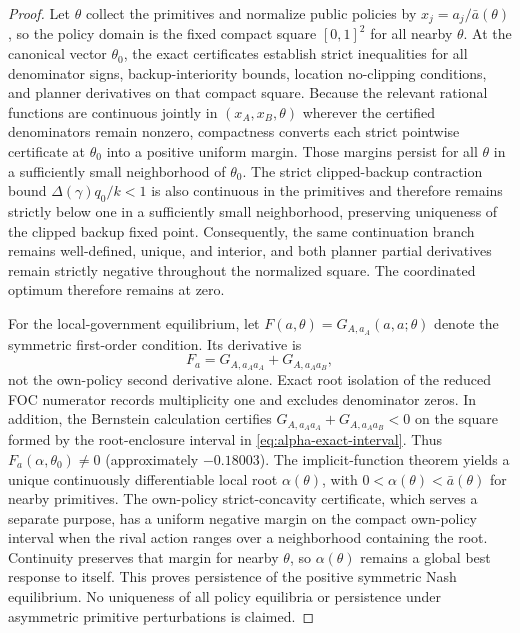 \begin{proof}
Let $\theta$ collect the primitives and normalize public policies by $x_j=a_j/\bar a(\theta)$, so the policy domain is the fixed compact square $[0,1]^2$ for all nearby $\theta$. At the canonical vector $\theta_0$, the exact certificates establish strict inequalities for all denominator signs, backup-interiority bounds, location no-clipping conditions, and planner derivatives on that compact square. Because the relevant rational functions are continuous jointly in $(x_A,x_B,\theta)$ wherever the certified denominators remain nonzero, compactness converts each strict pointwise certificate at $\theta_0$ into a positive uniform margin. Those margins persist for all $\theta$ in a sufficiently small neighborhood of $\theta_0$. The strict clipped-backup contraction bound $\Delta(\gamma)q_0/k<1$ is also continuous in the primitives and therefore remains strictly below one in a sufficiently small neighborhood, preserving uniqueness of the clipped backup fixed point. Consequently, the same continuation branch remains well-defined, unique, and interior, and both planner partial derivatives remain strictly negative throughout the normalized square. The coordinated optimum therefore remains at zero.

For the local-government equilibrium, let $F(a,\theta)=G_{A,a_A}(a,a;\theta)$ denote the symmetric first-order condition. Its derivative is
\begin{equation}
F_a=G_{A,a_Aa_A}+G_{A,a_Aa_B},
\label{eq:diagonal-foc-derivative}
\end{equation}
not the own-policy second derivative alone. Exact root isolation of the reduced FOC numerator records multiplicity one and excludes denominator zeros. In addition, the Bernstein calculation certifies $G_{A,a_Aa_A}+G_{A,a_Aa_B}<0$ on the square formed by the root-enclosure interval in \eqref{eq:alpha-exact-interval}. Thus $F_a(\alpha,\theta_0)\neq0$ (approximately $-0.18003$). The implicit-function theorem yields a unique continuously differentiable local root $\alpha(\theta)$, with $0<\alpha(\theta)<\bar a(\theta)$ for nearby primitives. The own-policy strict-concavity certificate, which serves a separate purpose, has a uniform negative margin on the compact own-policy interval when the rival action ranges over a neighborhood containing the root. Continuity preserves that margin for nearby $\theta$, so $\alpha(\theta)$ remains a global best response to itself. This proves persistence of the positive symmetric Nash equilibrium. No uniqueness of all policy equilibria or persistence under asymmetric primitive perturbations is claimed.
\end{proof}

